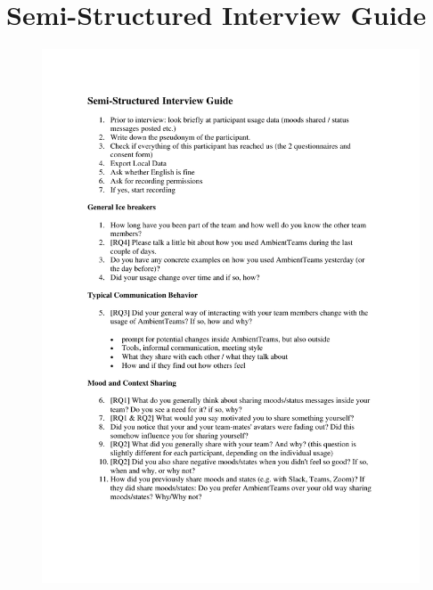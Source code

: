 \chapter{Semi-Structured Interview Guide}
\label{chapter:interview_guide}
\begin{figure}[h]
    \centering
    \includegraphics[width=\linewidth, page=1]{./documents/Semi-Structured Interview Guide.pdf}
\end{figure}

